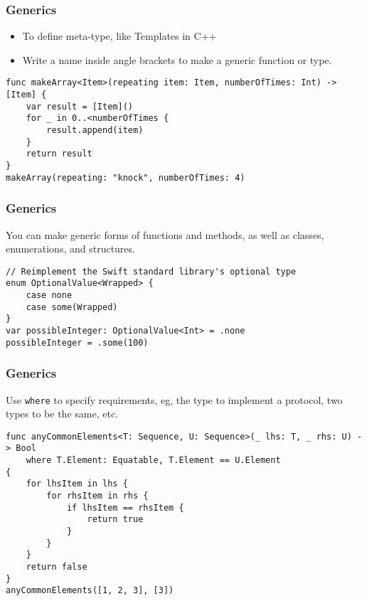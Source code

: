 \begin{frame}[fragile] \frametitle{Generics}

\begin{itemize}
\item To define meta-type, like Templates in C++
\item Write a name inside angle brackets to make a generic function or type.
\end{itemize}

\begin{lstlisting}
func makeArray<Item>(repeating item: Item, numberOfTimes: Int) -> [Item] {
    var result = [Item]()
    for _ in 0..<numberOfTimes {
        result.append(item)
    }
    return result
}
makeArray(repeating: "knock", numberOfTimes: 4)
\end{lstlisting}
\end{frame}

\begin{frame}[fragile] \frametitle{Generics}

You can make generic forms of functions and methods, as well as classes, enumerations, and structures.

\begin{lstlisting}
// Reimplement the Swift standard library's optional type
enum OptionalValue<Wrapped> {
    case none
    case some(Wrapped)
}
var possibleInteger: OptionalValue<Int> = .none
possibleInteger = .some(100)
\end{lstlisting}
\end{frame}

\begin{frame}[fragile] \frametitle{Generics}

Use \lstinline|where| to specify requirements, eg, the type to implement a protocol, two types to be the same, etc.

\begin{lstlisting}
func anyCommonElements<T: Sequence, U: Sequence>(_ lhs: T, _ rhs: U) -> Bool
    where T.Element: Equatable, T.Element == U.Element
{
    for lhsItem in lhs {
        for rhsItem in rhs {
            if lhsItem == rhsItem {
                return true
            }
        }
    }
    return false
}
anyCommonElements([1, 2, 3], [3])
\end{lstlisting}
\end{frame}


